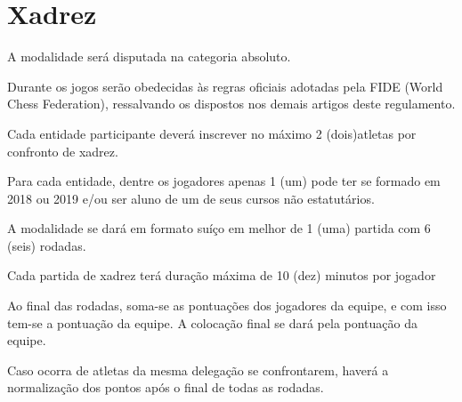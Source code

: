 {\let\clearpage\relax \chapter{Xadrez}}

\begin{article}
	A modalidade será disputada na categoria absoluto.
\end{article}

\begin{article}
	Durante os jogos serão obedecidas às regras oficiais adotadas pela FIDE (World Chess Federation), ressalvando os dispostos nos demais artigos deste regulamento.
\end{article}

\begin{article}
	Cada entidade participante deverá inscrever no máximo 2 (dois)atletas por confronto de xadrez.
	
	\begin{xparagraph}
	    Para cada entidade, dentre os jogadores apenas 1 (um) pode ter se formado em 2018 ou 2019 e/ou ser aluno de um de seus cursos não estatutários.
	\end{xparagraph}
\end{article}

\begin{article}
	A modalidade se dará em formato suíço em melhor de 1 (uma) partida com 6 (seis) rodadas.

	\begin{xparagraph}
		Cada partida de xadrez terá duração máxima de 10 (dez) minutos por jogador
	\end{xparagraph}

	\begin{xparagraph}
		Ao final das rodadas, soma-se as pontuações dos jogadores da equipe, e com isso tem-se a pontuação da equipe. A colocação final se dará pela pontuação da equipe.
	\end{xparagraph}

	\begin{xparagraph}
		Caso ocorra de atletas da mesma delegação se confrontarem, haverá a normalização dos pontos após o final de todas as rodadas.
	\end{xparagraph}

\end{article}

